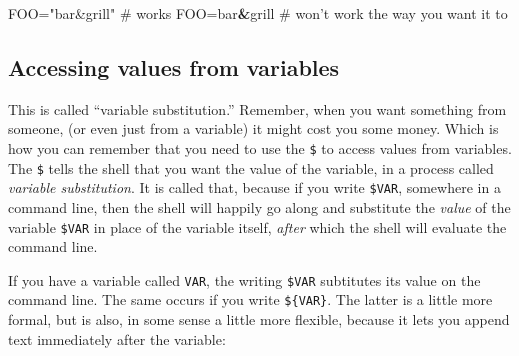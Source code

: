 \documentclass[]{krantz}
\makeatletter
\newenvironment{Shaded}{\begin{snugshade}}{\end{snugshade}}
\newcommand{\BuiltInTok}[1]{#1}
\newcommand{\CommentTok}[1]{\textcolor[rgb]{0.37,0.37,0.37}{\textit{#1}}}
\newcommand{\ExtensionTok}[1]{#1}
\newcommand{\KeywordTok}[1]{\textcolor[rgb]{0.27,0.27,0.27}{\textbf{#1}}}
\newcommand{\NormalTok}[1]{#1}
\newcommand{\StringTok}[1]{\textcolor[rgb]{0.5,0.5,0.5}{#1}}
\newcommand{\VariableTok}[1]{\textcolor[rgb]{0,0,0}{#1}}
\newenvironment{kframe}{%
\medskip{}
\setlength{\fboxsep}{.8em}
 \def\at@end@of@kframe{}%
 \ifinner\ifhmode%
  \def\at@end@of@kframe{\end{minipage}}%
  \begin{minipage}{\columnwidth}%
 \fi\fi%
 \def\FrameCommand##1{\hskip\@totalleftmargin \hskip-\fboxsep
 \colorbox{shadecolor}{##1}\hskip-\fboxsep
     \hskip-\linewidth \hskip-\@totalleftmargin \hskip\columnwidth}%
 \MakeFramed {\advance\hsize-\width
   \@totalleftmargin\z@ \linewidth\hsize
   \@setminipage}}%
 {\par\unskip\endMakeFramed%
 \at@end@of@kframe}
\renewenvironment{Shaded}{\begin{kframe}}{\end{kframe}}
\makeatother
\begin{document}
\begin{Shaded}
\begin{Highlighting}[]
\VariableTok{FOO=}\StringTok{"bar&grill"}\NormalTok{  # }\ExtensionTok{works}
\VariableTok{FOO=}\NormalTok{bar}\KeywordTok{&}\ExtensionTok{grill}\NormalTok{    # won}\StringTok{'t work the way you want it to}
\end{Highlighting}
\end{Shaded}

\hypertarget{accessing-values-from-variables}{%
\subsection{Accessing values from variables}\label{accessing-values-from-variables}}

This is called ``variable substitution.'' Remember, when you want something from someone, (or even
just from a variable) it might cost you some money. Which is how you can
remember that you need to use the \texttt{\$} to access values from variables. The \texttt{\$} tells the
shell that you want the value of the variable, in a process called \emph{variable substitution}. It is
called that, because if you write \texttt{\$VAR}, somewhere in a command line, then
the shell will happily go along and substitute the \emph{value} of the variable \texttt{\$VAR} in place of the variable
itself, \emph{after} which the shell will evaluate the command line.

If you have a variable called \texttt{VAR}, the writing \texttt{\$VAR} subtitutes its value on the command line.
The same occurs if you write \texttt{\$\{VAR\}}. The latter is a little more formal, but is also, in
some sense a little more flexible, because it lets you append text immediately after the variable:

\begin{Shaded}
\end{Shaded}
\end{document}
